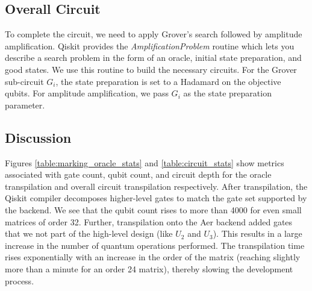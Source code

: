 \documentclass[11pt]{article}
\theoremstyle{definition}
\theoremstyle{remark}
\begin{document}
\subsection{Overall Circuit}

To complete the circuit, we need to apply Grover's search followed by amplitude
amplification. Qiskit provides the \emph{AmplificationProblem} routine which lets
you describe a search problem in the form of an oracle, initial state
preparation, and good states. We use this routine to build the necessary
circuits. For the Grover sub-circuit $G_i$, the state preparation is set to a
Hadamard on the objective qubits. For amplitude amplification, we pass $G_i$ as
the state preparation parameter.



\subsection{Discussion}

Figures \ref{table:marking_oracle_stats} and \ref{table:circuit_stats} show metrics
associated with gate count, qubit count, and circuit depth for the oracle
transpilation and overall circuit transpilation respectively. After
transpilation, the Qiskit compiler decomposes higher-level gates to match the
gate set supported by the backend. We see that the qubit count rises to more
than 4000 for even small matrices of order 32. Further, transpilation onto the
Aer backend added gates that we not part of the high-level design (like $U_2$
and $U_3$). This results in a large increase in the number of quantum
operations performed. The transpilation time rises exponentially with an
increase in the order of the matrix (reaching slightly more than a minute for
an order 24 matrix), thereby slowing the development process.
\end{document}
